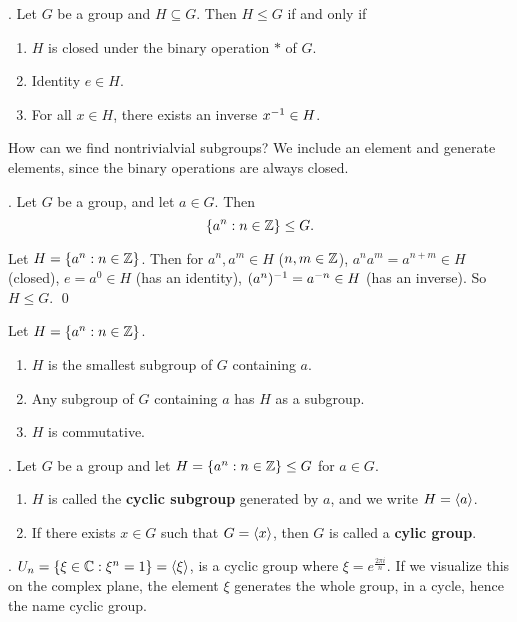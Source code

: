 \thm. Let \(G\) be a group and \(H \subseteq G\). Then \(H \leq G\) if and only if
\begin{enumerate}
    \item \(H\) is closed under the binary operation \(*\) of \(G\).
    \item Identity \(e \in H\).
    \item For all \(x \in H\), there exists an inverse \(x^{-1} \in H\).
\end{enumerate}

How can we find nontrivialvial subgroups? We include an element and generate elements, since the binary operations are always closed.

\thm. Let \(G\) be a group, and let \(a \in G\). Then
\[
    \{a^n : n \in \mathbb{Z}\} \leq G.
\]

\pf Let \(H = \{a^n : n \in \mathbb{Z}\}\). Then for \(a^n, a^m \in H\) (\(n, m \in \mathbb{Z}\)), \(a^na^m = a^{n+m} \in H\) (closed), \(e = a^0 \in H\) (has an identity), \((a^n)^{-1} = a^{-n} \in H\) (has an inverse). So \(H \leq G\). \qed

\pagebreak

\rmk Let \(H = \{a^n : n \in \mathbb{Z}\}\).
\begin{enumerate}
    \item \(H\) is the smallest subgroup of \(G\) containing \(a\).
    \item Any subgroup of \(G\) containing \(a\) has \(H\) as a subgroup.
    \item \(H\) is commutative.
\end{enumerate}

.  Let \(G\) be a group and let \(H = \{a^n : n \in \mathbb{Z}\} \leq G\) for \(a \in G\).
\begin{enumerate}
    \item \(H\) is called the \textbf{cyclic subgroup} generated by \(a\), and we write \(H = \left\langle a \right\rangle\).
    \item If there exists \(x \in G\) such that \(G = \left\langle x \right\rangle\), then \(G\) is called a \textbf{cylic group}.
\end{enumerate}

\ex. \(U_n = \{\xi \in \mathbb{C} : \xi^n = 1\} = \left\langle \xi \right\rangle\), is a cyclic group where \(\xi = e^{\frac{2\pi i}{n}}\). If we visualize this on the complex plane, the element \(\xi\) generates the whole group, in a cycle, hence the name cyclic group.

\smallskip
